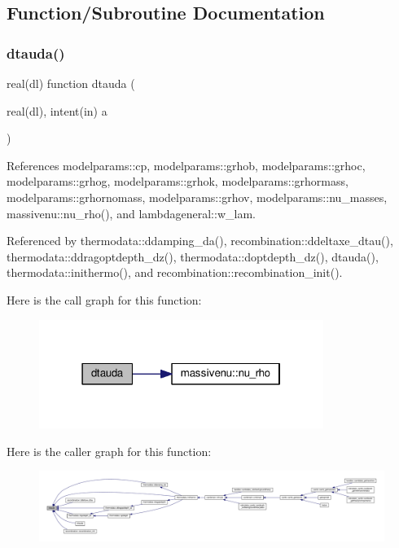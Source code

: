 \subsection{Function/\+Subroutine Documentation}
\mbox{\label{equations_8f90_a1c228811398a4401bb57d778911a13df}} 
\subsubsection{\texorpdfstring{dtauda()}{dtauda()}}
{\footnotesize\ttfamily real(dl) function dtauda (\begin{DoxyParamCaption}\item[{real(dl), intent(in)}]{a }\end{DoxyParamCaption})}



References modelparams\+::cp, modelparams\+::grhob, modelparams\+::grhoc, modelparams\+::grhog, modelparams\+::grhok, modelparams\+::grhormass, modelparams\+::grhornomass, modelparams\+::grhov, modelparams\+::nu\+\_\+masses, massivenu\+::nu\+\_\+rho(), and lambdageneral\+::w\+\_\+lam.



Referenced by thermodata\+::ddamping\+\_\+da(), recombination\+::ddeltaxe\+\_\+dtau(), thermodata\+::ddragoptdepth\+\_\+dz(), thermodata\+::doptdepth\+\_\+dz(), dtauda(), thermodata\+::inithermo(), and recombination\+::recombination\+\_\+init().

Here is the call graph for this function\+:
\nopagebreak
\begin{figure}[H]
\begin{center}
\leavevmode
\includegraphics[width=262pt]{equations_8f90_a1c228811398a4401bb57d778911a13df_cgraph}
\end{center}
\end{figure}
Here is the caller graph for this function\+:
\nopagebreak
\begin{figure}[H]
\begin{center}
\leavevmode
\includegraphics[width=350pt]{equations_8f90_a1c228811398a4401bb57d778911a13df_icgraph}
\end{center}
\end{figure}
\mbox{\label{equations_8f90_a2c95a3b42a68aa87a21097ce3ff8bbe6}} 
